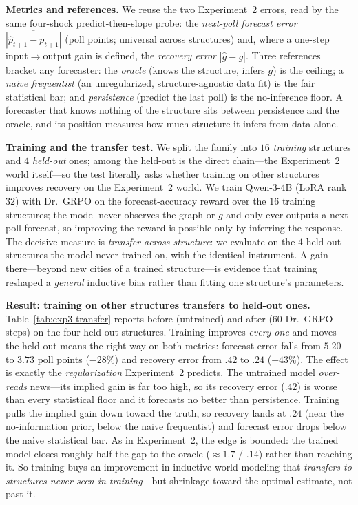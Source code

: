 \documentclass{article} %
\begin{document}
\textbf{Metrics and references.}  We reuse the two Experiment~2 errors, read by the same four-shock
predict-then-slope probe: the \emph{next-poll forecast error} $\overline{|\hat p_{t+1}-p_{t+1}|}$ (poll
points; universal across structures) and, where a one-step input$\to$output gain is defined, the
\emph{recovery error} $\overline{|\hat g-g|}$.  Three references bracket any forecaster: the
\emph{oracle} (knows the structure, infers $g$) is the ceiling; a \emph{naive frequentist} (an
unregularized, structure-agnostic data fit) is the fair statistical bar; and \emph{persistence}
(predict the last poll) is the no-inference floor.  A forecaster that knows nothing of the structure
sits between persistence and the oracle, and its position measures how much structure it infers from
data alone.

\textbf{Training and the transfer test.}  We split the family into $16$ \emph{training} structures and
$4$ \emph{held-out} ones; among the held-out is the direct chain---the Experiment~2 world itself---so
the test literally asks whether training on other structures improves recovery on the Experiment~2
world.  We train Qwen-3-4B (LoRA rank $32$) with Dr.\ GRPO on the forecast-accuracy reward over the $16$
training structures; the model never observes the graph or $g$ and only ever outputs a next-poll
forecast, so improving the reward is possible only by inferring the response.  The decisive measure is
\emph{transfer across structure}: we evaluate on the $4$ held-out structures the model never trained
on, with the identical instrument. A gain there---beyond new cities of a trained structure---is
evidence that training reshaped a \emph{general} inductive bias rather than fitting one structure's
parameters.

\textbf{Result: training on other structures transfers to held-out ones.}
Table~\ref{tab:exp3-transfer} reports before (untrained) and after ($60$ Dr.\ GRPO steps) on the four
held-out structures.  Training improves \emph{every one} and moves the held-out means the right way on
both metrics: forecast error falls from $5.20$ to $3.73$ poll points ($-28\%$) and recovery error from
$.42$ to $.24$ ($-43\%$).  The effect is exactly the \emph{regularization} Experiment~2 predicts.  The
untrained model \emph{over-reads} news---its implied gain is far too high, so its recovery error
($.42$) is worse than every statistical floor and it forecasts no better than persistence.  Training
pulls the implied gain down toward the truth, so recovery lands at $.24$ (near the no-information prior,
below the naive frequentist) and forecast error drops below the naive statistical bar.  As in
Experiment~2, the edge is bounded: the trained model closes roughly half the gap to the oracle
($\approx1.7$ / $.14$) rather than reaching it.  So training buys an improvement in inductive
world-modeling that \emph{transfers to structures never seen in training}---but shrinkage toward the
optimal estimate, not past it.
\end{document}

